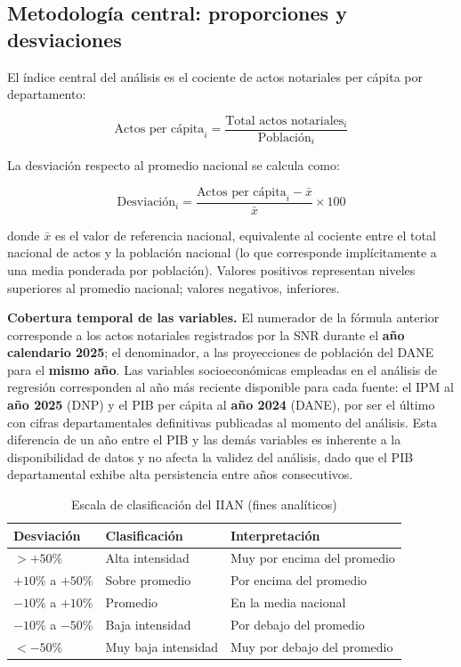 \documentclass{article}
\begin{document}
\subsection{Metodología central: proporciones y desviaciones}

El índice central del análisis es el cociente de actos 
notariales per cápita por departamento:

\begin{equation}
\text{Actos per cápita}_i = 
\frac{\text{Total actos notariales}_i}{\text{Población}_i}
\end{equation}

La desviación respecto al promedio nacional se calcula como:

\begin{equation}
\text{Desviación}_i = 
\frac{\text{Actos per cápita}_i - \bar{x}}{\bar{x}} 
\times 100
\end{equation}

donde $\bar{x}$ es el valor de referencia nacional, equivalente al
cociente entre el total nacional de actos y la población nacional
(lo que corresponde implícitamente a una media ponderada por
población). Valores positivos representan niveles superiores al
promedio nacional; valores negativos, inferiores.

\medskip
\noindent\textbf{Cobertura temporal de las variables.}
El numerador de la fórmula anterior corresponde a los actos
notariales registrados por la SNR durante el \textbf{año calendario
2025}; el denominador, a las proyecciones de población del DANE para
el \textbf{mismo año}. Las variables socioeconómicas empleadas en el
análisis de regresión corresponden al año más reciente disponible
para cada fuente: el IPM al \textbf{año 2025} (DNP) y el PIB per
cápita al \textbf{año 2024} (DANE), por ser el último con cifras
departamentales definitivas publicadas al momento del análisis.
Esta diferencia de un año entre el PIB y las demás variables es
inherente a la disponibilidad de datos y no afecta la validez del
análisis, dado que el PIB departamental exhibe alta persistencia
entre años consecutivos.

\begin{table}[H]
\centering
\begin{tabular}{lll}
\toprule
\textbf{Desviación} & \textbf{Clasificación} & 
\textbf{Interpretación} \\
\midrule
$> +50\%$ & Alta intensidad &
Muy por encima del promedio \\
$+10\%$ a $+50\%$ & Sobre promedio &
Por encima del promedio \\
$-10\%$ a $+10\%$ & Promedio &
En la media nacional \\
$-10\%$ a $-50\%$ & Baja intensidad &
Por debajo del promedio \\
$< -50\%$ & Muy baja intensidad &
Muy por debajo del promedio \\
\bottomrule
\end{tabular}
\caption{Escala de clasificación del IIAN (fines analíticos)}
\end{table}
\end{document}
